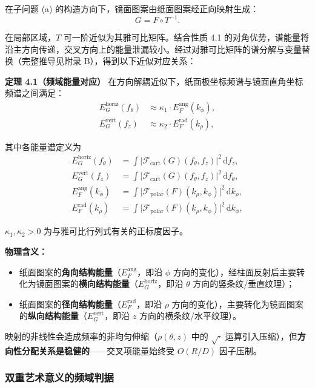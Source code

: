 \documentclass[12pt,a4paper]{ctexart}
\begin{document}
在子问题 (a) 的构造方向下，镜面图案由纸面图案经正向映射生成：
\[
G = F \circ T^{-1}.
\]

在局部区域，$T$ 可一阶近似为其雅可比矩阵。结合性质 4.1 的对角优势，谱能量将沿主方向传递，交叉方向上的能量泄漏较小。经过对雅可比矩阵的谱分解与变量替换（完整推导见附录 B），得到以下近似对应关系：

\textbf{定理 4.1（频域能量对应）} 在方向解耦近似下，纸面极坐标频谱与镜面直角坐标频谱之间满足：
\[
\begin{aligned}
E_G^{\mathrm{horiz}}(f_\theta) &\approx \kappa_1 \cdot E_F^{\mathrm{ang}}(k_\phi),\\
E_G^{\mathrm{vert}}(f_z) &\approx \kappa_2 \cdot E_F^{\mathrm{rad}}(k_\rho),
\end{aligned}
\]

其中各能量谱定义为
\[
\begin{aligned}
E_G^{\mathrm{horiz}}(f_\theta) &= \int \bigl|\mathcal{F}_{\mathrm{cart}}(G)(f_\theta,f_z)\bigr|^2\,\mathrm{d}f_z,\\
E_G^{\mathrm{vert}}(f_z) &= \int \bigl|\mathcal{F}_{\mathrm{cart}}(G)(f_\theta,f_z)\bigr|^2\,\mathrm{d}f_\theta,\\
E_F^{\mathrm{ang}}(k_\phi) &= \int \bigl|\mathcal{F}_{\mathrm{polar}}(F)(k_\rho,k_\phi)\bigr|^2\,\mathrm{d}k_\rho,\\
E_F^{\mathrm{rad}}(k_\rho) &= \int \bigl|\mathcal{F}_{\mathrm{polar}}(F)(k_\rho,k_\phi)\bigr|^2\,\mathrm{d}k_\phi,
\end{aligned}
\]

$\kappa_1,\kappa_2>0$ 为与雅可比行列式有关的正标度因子。

\textbf{物理含义：}
\begin{itemize}
    \item 纸面图案的\textbf{角向结构能量}（$E_F^{\mathrm{ang}}$，即沿 $\phi$ 方向的变化），经柱面反射后主要转化为镜面图案的\textbf{横向结构能量}（$E_G^{\mathrm{horiz}}$，即沿 $\theta$ 方向的竖条纹/垂直纹理）；
    \item 纸面图案的\textbf{径向结构能量}（$E_F^{\mathrm{rad}}$，即沿 $\rho$ 方向的变化），主要转化为镜面图案的\textbf{纵向结构能量}（$E_G^{\mathrm{vert}}$，即沿 $z$ 方向的横条纹/水平纹理）。
\end{itemize}
映射的非线性会造成频率的非均匀伸缩（$\rho(\theta,z)$ 中的 $\sqrt{\cdot}$ 运算引入压缩），但\textbf{方向性分配关系是稳健的}——交叉项能量始终受 $O(R/D)$ 因子压制。

\subsubsection{双重艺术意义的频域判据}
\end{document}

